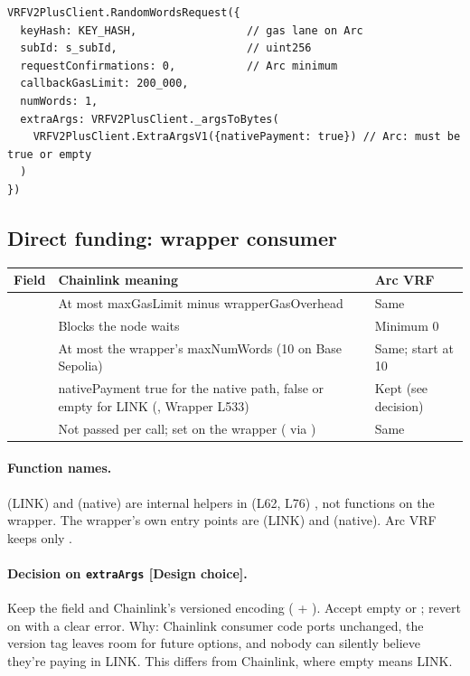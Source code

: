 \documentclass[11pt,a4paper]{article}
\begin{document}
\begin{lstlisting}[language=Solidity]
VRFV2PlusClient.RandomWordsRequest({
  keyHash: KEY_HASH,                 // gas lane on Arc
  subId: s_subId,                    // uint256
  requestConfirmations: 0,           // Arc minimum
  callbackGasLimit: 200_000,
  numWords: 1,
  extraArgs: VRFV2PlusClient._argsToBytes(
    VRFV2PlusClient.ExtraArgsV1({nativePayment: true}) // Arc: must be true or empty
  )
})
\end{lstlisting}

\subsection{Direct funding: wrapper consumer}
{\small
\begin{tabularx}{\textwidth}{P{3.0cm}LP{2.8cm}}
\toprule
Field & Chainlink meaning & Arc VRF\\
\midrule
{} & At most maxGasLimit minus wrapperGasOverhead \cite{cldf} & Same\\
 & Blocks the node waits & Minimum 0\\
 & At most the wrapper's maxNumWords (10 on Base Sepolia) & Same; start at 10\\
 & nativePayment true for the native path, false or empty for LINK (, Wrapper L533) & Kept (see decision)\\
 & Not passed per call; set on the wrapper ( via ) & Same\\
\bottomrule
\end{tabularx}}

\paragraph{Function names.}  (LINK) and  (native) are internal helpers in  (L62, L76) \cite{clwrapperbase}, not functions on the wrapper. The wrapper's own entry points are  (LINK) and  (native). Arc VRF keeps only .

\paragraph{Decision on \texttt{extraArgs} [Design choice].} Keep the  field and Chainlink's versioned encoding ( + ). Accept empty or ; revert on  with a clear error. Why: Chainlink consumer code ports unchanged, the version tag leaves room for future options, and nobody can silently believe they're paying in LINK. This differs from Chainlink, where empty means LINK.
\end{document}
